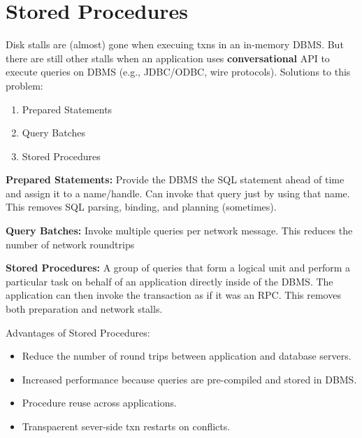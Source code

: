 \documentclass[11pt]{article}
\begin{document}
\maketitle
\thispagestyle{plain}


\section{Stored Procedures}
Disk stalls are (almost) gone when execuing txns in an in-memory DBMS.
But there are still other stalls when an application uses \textbf{conversational} API to 
execute queries on DBMS (e.g., JDBC/ODBC, wire protocols).
Solutions to this problem:
\begin{enumerate}
    \item Prepared Statements
    \item Query Batches
    \item Stored Procedures
\end{enumerate}

\textbf{Prepared Statements:}
Provide the DBMS the SQL statement ahead of time and assign it to a name/handle.
Can invoke that query just by using that name.
This removes SQL parsing, binding, and planning (sometimes).
        
\textbf{Query Batches:}
Invoke multiple queries per network message.
This reduces the number of network roundtrips
        
\textbf{Stored Procedures:}
A group of queries that form a logical unit and perform a particular task on behalf of an 
application directly inside of the DBMS.
The application can then invoke the transaction as if it was an RPC.
This removes both preparation and network stalls.

Advantages of Stored Procedures:
\begin{itemize}
    \item
    Reduce the number of round trips between application and database servers.
    
    \item
    Increased performance because queries are pre-compiled and stored in DBMS.
    
    \item
    Procedure reuse across applications.
    
    \item
    Transpaerent sever-side txn restarts on conflicts.
\end{itemize}
\end{document}
